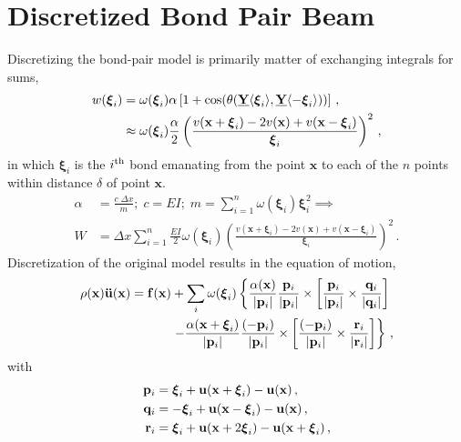 \section{Discretized Bond Pair Beam}
Discretizing the bond-pair model is primarily matter of exchanging integrals for sums,
%
\begin{align}
%
w(\boldsymbol{\xi}_i) &= \omega(\boldsymbol{\xi}_i)\alpha \left[1+\cos(\theta(\vstate{Y}{}{\boldsymbol{\xi}_i},\vstate{Y}{}{-\boldsymbol{\xi}_i})) \right]\, , \notag \\
&\approx \omega(\boldsymbol{\xi}_i)\frac{\alpha}{2}\left(\frac{v(\mathbf{x}+\boldsymbol{\xi}_i)-2v(\mathbf{x})+v(\mathbf{x}-\boldsymbol{\xi}_i)}{\boldsymbol{\xi}_i}\right)^2\,,\notag
\end{align}
%
in which $\boldsymbol{\xi}_i$ is the $i^\textnormal{th}$ bond emanating from the point $\mathbf{x}$ to each of the $n$ points within distance $\delta$ of point $\mathbf{x}$.
%
\begin{align}
\label{eq:discreteBeamw}
\alpha &= \frac{c\; \Delta x}{m} ;\; c= EI ;\; m=\sum_{i=1}^n \omega(\boldsymbol{\xi}_i)\boldsymbol{\xi}_i^2 \implies \nonumber \\
W&=\Delta x \sum_{i=1}^n \frac{EI}{2}\omega(\boldsymbol{\xi}_i)\left(\frac{v(\mathbf{x}+\boldsymbol{\xi}_i)-2v(\mathbf{x})+v(\mathbf{x}-\boldsymbol{\xi}_i)}{\boldsymbol{\xi}_i}\right)^2\,.
\end{align}
%
Discretization of the original model results in the equation of motion,
\begin{align}
\rho(\mathbf{x})\mathbf{\ddot{u}}(\mathbf{x}) = \mathbf{f}(\mathbf{x})&+\sum_i \omega(\boldsymbol{\xi}_i)\left\{\frac{\alpha(\mathbf{x})}{|\mathbf{p}_i |}\frac{\mathbf{p}_i}{|\mathbf{p}_i |}\times \left[ \frac{\mathbf{p}_i}{|\mathbf{p}_i |}\times \frac{\mathbf{q}_i}{|\mathbf{q}_i |}\right] \right. \notag \\
& \left. -\frac{\alpha(\mathbf{x}+\boldsymbol{\xi}_i)}{|\mathbf{p}_i |}\frac{(-\mathbf{p}_i)}{|\mathbf{p}_i |}\times\left[\frac{(-\mathbf{p}_i)}{|\mathbf{p}_i |}\times \frac{\mathbf{r}_i}{|\mathbf{r}_i |} \right] \right\} \,,
\label{eq:discretebeamEoM}
\end{align}
with
\begin{align}
\mathbf{p}_i &= \boldsymbol{\xi}_i+\mathbf{u}(\mathbf{x}+\boldsymbol{\xi}_i)-\mathbf{u}(\mathbf{x})\, ,\notag\\
\mathbf{q}_i &= -\boldsymbol{\xi}_i+\mathbf{u}(\mathbf{x}-\boldsymbol{\xi}_i)-\mathbf{u}(\mathbf{x})\, ,\notag\\
\mathbf{r}_i &= \boldsymbol{\xi}_i+\mathbf{u}(\mathbf{x}+2\boldsymbol{\xi}_i)-\mathbf{u}(\mathbf{x}+\boldsymbol{\xi}_i)\, ,\notag
\end{align}
